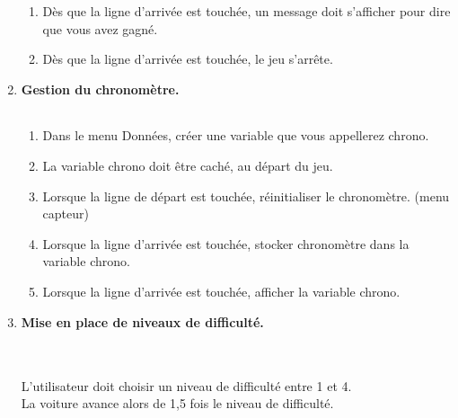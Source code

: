 \documentclass[12pt,a4paper]{article} %
\begin{document}
\begin{enumerate}[1{)}]
\begin{tabular}{|p{5mm}|}
\hline
\\
\hline
\end{tabular} \vspace{-6pt}
\begin{enumerate}[a{)}]
\item
Dès que la ligne d'arrivée est touchée, un message doit s'afficher pour dire que vous avez gagné.
\item
Dès que la ligne d'arrivée est touchée, le jeu s'arrête.
\end{enumerate} \vspace{6pt}
\item
\textbf{Gestion du chronomètre.} \hfill \renewcommand{\arraystretch}{2}
\begin{tabular}{|p{5mm}|}
\hline
\\
\hline
\end{tabular} \vspace{-6pt}
\begin{enumerate}[a{)}]
\item
Dans le menu Données, créer une variable que vous appellerez chrono.
\item
La variable chrono doit être caché, au départ du jeu.
\item
Lorsque la ligne de départ est touchée, réinitialiser le chronomètre. (menu capteur)
\item
Lorsque la ligne d'arrivée est touchée, stocker chronomètre dans la variable chrono.
\item
Lorsque la ligne d'arrivée est touchée, afficher la variable chrono.
\end{enumerate}
\item
\textbf{Mise en place de niveaux de difficulté.} \hfill \renewcommand{\arraystretch}{2}
\begin{tabular}{|p{5mm}|}
\hline
\\
\hline
\end{tabular} \vspace{-3pt} \\
L'utilisateur doit choisir un niveau de difficulté entre 1 et 4. \\
La voiture avance alors de 1,5 fois le niveau de difficulté.
\end{enumerate}
\end{document}
